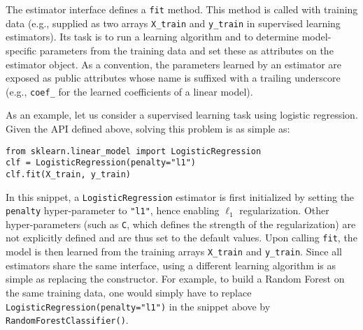 \documentclass{llncs}
\begin{document}
The estimator interface defines a \texttt{fit} method. This method is called
with training data (e.g., supplied as two arrays \texttt{X\_train} and
\texttt{y\_train} in supervised learning estimators). Its task is to run a
learning algorithm and to determine model- specific parameters from the training
data and set these as attributes on the estimator object. As a convention, the
parameters learned by an estimator are exposed as public attributes whose name
is suffixed with a trailing underscore (e.g., \texttt{coef\_} for the
learned coefficients of a linear model).


As an example, let us consider a supervised learning task using logistic regression.
Given the API defined above, solving this problem is as simple as:
\begin{verbatim}
from sklearn.linear_model import LogisticRegression
clf = LogisticRegression(penalty="l1")
clf.fit(X_train, y_train)
\end{verbatim}
In this snippet, a \texttt{LogisticRegression} estimator is first initialized by
setting the \texttt{penalty} hyper-parameter to \texttt{"l1"}, hence enabling
$\ell_1$ regularization. Other hyper-parameters (such as \texttt{C}, which
defines the strength of the regularization) are not explicitly defined and are
thus set to the default values. Upon calling \texttt{fit}, the model is then
learned from the training arrays \texttt{X\_train} and \texttt{y\_train}. Since
all estimators share the same interface, using a different learning algorithm is
as simple as replacing the constructor. For example, to build a Random Forest on
the same training data, one would simply have to replace
\texttt{LogisticRegression(penalty="l1")} in the snippet above by \\
\texttt{RandomForestClassifier()}. 
\end{document}
